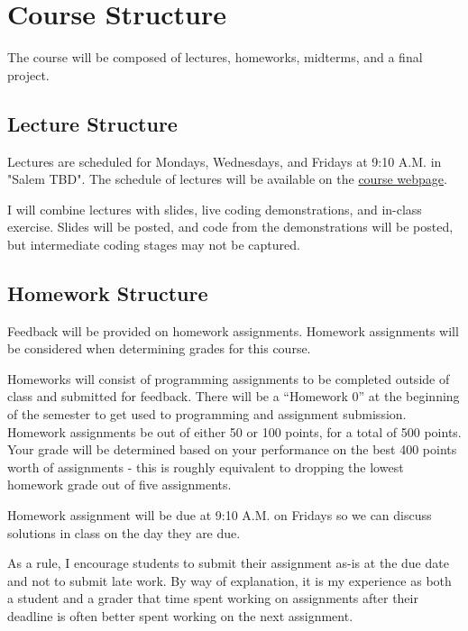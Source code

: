 \documentclass[11pt]{article}
\begin{document}

\section*{Course Structure}

The course will be composed of lectures, homeworks, midterms, and a final project.

\subsection*{Lecture Structure}

Lectures are scheduled for Mondays, Wednesdays, and Fridays at 9:10 A.M. in "Salem TBD". The schedule
of lectures will be available on the \href{https://cd-public.github.io/courses/strs24}{course webpage}.

\bigskip
\noindent I will combine lectures with slides, live coding demonstrations, and in-class exercise. Slides will be posted, and code from the demonstrations will be posted, but intermediate coding stages may not be captured. 

\subsection*{Homework Structure}

Feedback will be provided on homework assignments. Homework assignments will be considered when determining grades for this course.

\bigskip
\noindent Homeworks will consist of programming assignments to be completed outside of class and submitted
for feedback. There will be a ``Homework 0'' at the beginning of the semester to get used to
programming and assignment submission. Homework assignments be out of either 50 or 100 points, for a total of 500 points.
Your grade will be determined based on your performance on the best 400 points worth of assignments - this is roughly equivalent
to dropping the lowest homework grade out of five assignments.

\bigskip
\noindent Homework assignment will be due at 9:10 A.M. on Fridays so we can discuss solutions in class on the 
day they are due.

\bigskip
\noindent As a rule, I encourage students to submit their assignment as-is at the due date and not to
submit late work. By way of explanation, it is my experience as both a student and a grader that time spent working on assignments after their deadline is often better spent working on the next assignment.
\end{document}
